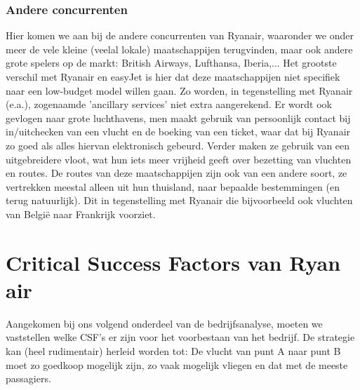 \documentclass{article}
\begin{document}
\section{Andere concurrenten}

Hier komen we aan bij de andere concurrenten van Ryanair, waaronder we onder meer de vele kleine (veelal lokale) maatschappijen terugvinden, maar ook andere grote spelers op de markt: British Airways, Lufthansa, Iberia,... 
Het grootste verschil met Ryanair en easyJet is hier dat deze maatschappijen niet specifiek naar een low-budget model willen gaan. Zo worden, in tegenstelling met Ryanair (e.a.), zogenaamde 'ancillary services' niet extra aangerekend. Er wordt ook gevlogen naar grote luchthavens, men maakt gebruik van persoonlijk contact bij in/uitchecken van een vlucht en de boeking van een ticket, waar dat bij Ryanair zo goed als alles hiervan elektronisch gebeurd. Verder maken ze gebruik van een uitgebreidere vloot, wat hun iets meer vrijheid geeft over bezetting van vluchten en routes.
De routes van deze maatschappijen zijn ook van een andere soort, ze vertrekken meestal alleen uit hun thuisland, naar bepaalde bestemmingen (en terug natuurlijk). Dit in tegenstelling met Ryanair die bijvoorbeeld ook vluchten van Belgi\"e naar Frankrijk voorziet.

\part{Critical Success Factors van Ryan air}

Aangekomen bij ons volgend onderdeel van de bedrijfsanalyse, moeten we vaststellen welke CSF's er zijn voor het voorbestaan van het bedrijf. De strategie kan (heel rudimentair) herleid worden tot: De vlucht van punt A naar punt B moet zo goedkoop mogelijk zijn, zo vaak mogelijk vliegen en dat met de meeste passagiers.
\end{document}
